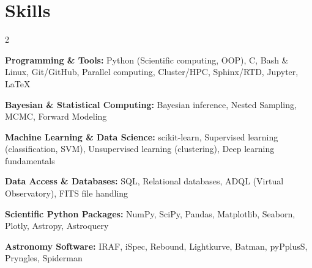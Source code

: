 \section*{Skills}
\begin{multicols}{2}

\textbf{Programming \& Tools:}
Python (Scientific computing, OOP), C, Bash \& Linux, Git/GitHub, Parallel computing, Cluster/HPC, Sphinx/RTD, Jupyter, LaTeX

\textbf{Bayesian \& Statistical Computing:}
Bayesian inference, Nested Sampling, MCMC, Forward Modeling

\textbf{Machine Learning \& Data Science:}
scikit-learn, Supervised learning (classification, SVM), Unsupervised learning (clustering), Deep learning fundamentals

\textbf{Data Access \& Databases:}
SQL, Relational databases, ADQL (Virtual Observatory), FITS file handling

\textbf{Scientific Python Packages:}
NumPy, SciPy, Pandas, Matplotlib, Seaborn, Plotly, Astropy, Astroquery

\textbf{Astronomy Software:}
IRAF, iSpec, Rebound, Lightkurve, Batman, pyPplusS, Pryngles, Spiderman

\end{multicols}

